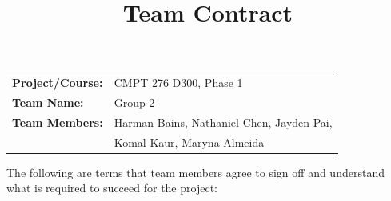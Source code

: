 \documentclass[10pt,letterpaper]{article}
\title{Team Contract}
\author{}
\begin{document}
\maketitle

\begin{tabular}{ll}
\textbf{Project/Course:} & CMPT 276 D300, Phase 1 \\
\textbf{Team Name:}      & Group 2 \\
\textbf{Team Members:}   & Harman Bains, Nathaniel Chen, Jayden Pai, \\
                         & Komal Kaur, Maryna Almeida
\end{tabular}

\vspace{1em}

The following are terms that team members agree to sign off and understand what is required to succeed for the project:
\end{document}
